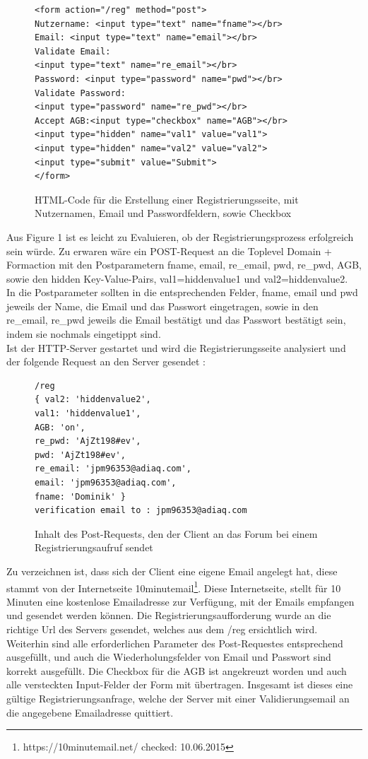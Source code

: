 \begin{figure}[h!]
\begin{lstlisting}[language=HTML5]
<form action="/reg" method="post">
Nutzername: <input type="text" name="fname"></br>
Email: <input type="text" name="email"></br>
Validate Email: 
<input type="text" name="re_email"></br>
Password: <input type="password" name="pwd"></br>
Validate Password: 
<input type="password" name="re_pwd"></br>
Accept AGB:<input type="checkbox" name="AGB"></br>
<input type="hidden" name="val1" value="val1">
<input type="hidden" name="val2" value="val2">
<input type="submit" value="Submit">
</form>
\end{lstlisting}
\caption{HTML-Code für die Erstellung einer Registrierungsseite, mit Nutzernamen, Email und Passwordfeldern, sowie Checkbox}
\end{figure}
\newpage

Aus Figure 1 ist es leicht zu Evaluieren, ob der Registrierungsprozess erfolgreich sein würde. Zu erwaren wäre ein POST-Request an die Toplevel Domain + Formaction mit den Postparametern fname, email, re\_email, pwd, re\_pwd, AGB, sowie den hidden Key-Value-Pairs, val1=hiddenvalue1 und val2=hiddenvalue2.\\
In die Postparameter sollten in die entsprechenden Felder, fname, email und pwd jeweils der Name, die Email und das Passwort eingetragen, sowie in den re\_email, re\_pwd jeweils die Email bestätigt und das Passwort bestätigt sein, indem sie nochmals eingetippt sind.\\
Ist der HTTP-Server gestartet und wird die Registrierungsseite analysiert und der folgende Request an den Server gesendet :

\begin{figure}[ht]
\begin{lstlisting}[language=HTML5]
/reg
{ val2: 'hiddenvalue2',
val1: 'hiddenvalue1',
AGB: 'on',
re_pwd: 'AjZt198#ev',
pwd: 'AjZt198#ev',
re_email: 'jpm96353@adiaq.com',
email: 'jpm96353@adiaq.com',
fname: 'Dominik' }
verification email to : jpm96353@adiaq.com
\end{lstlisting}
\caption{Inhalt des Post-Requests, den der Client an das Forum bei einem Registrierungsaufruf sendet}
\end{figure}

Zu verzeichnen ist, dass sich der Client eine eigene Email angelegt hat, diese stammt von der Internetseite 10minutemail\footnote{https://10minutemail.net/ checked: 10.06.2015}.
Diese Internetseite, stellt für 10 Minuten eine kostenlose Emailadresse zur Verfügung, mit der Emails empfangen und gesendet werden können. Die Registrierungsaufforderung wurde an die richtige Url des Servers gesendet, welches aus dem /reg ersichtlich wird. Weiterhin sind alle erforderlichen Parameter des Post-Requestes entsprechend ausgefüllt, und auch die Wiederholungsfelder von Email und Passwort sind korrekt ausgefüllt. Die Checkbox für die AGB ist angekreuzt worden und auch alle versteckten Input-Felder der Form mit übertragen. Insgesamt ist dieses eine gültige Registrierungsanfrage, welche der Server mit einer Validierungsemail an die angegebene Emailadresse quittiert.

